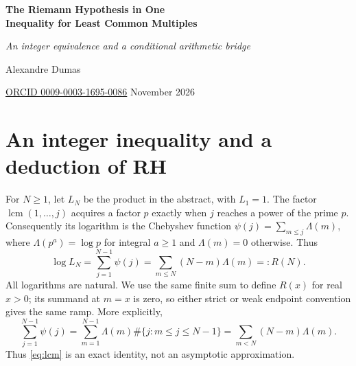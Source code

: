 \documentclass[11pt,a4paper]{article}
\newcommand{\lcm}{\operatorname{lcm}}
\begin{document}
\thispagestyle{plain}
\begin{center}
{\fontsize{22}{26}\selectfont\bfseries The Riemann Hypothesis in One\\[2pt] Inequality for Least Common Multiples\par}
\vspace{7pt}
{\large\itshape An integer equivalence and a conditional arithmetic bridge\par}
\vspace{12pt}
{\large Alexandre Dumas\par}
\vspace{2pt}
{\small\href{https://orcid.org/0009-0003-1695-0086}{ORCID 0009-0003-1695-0086}\quad\textperiodcentered{} November 2026\par}
\end{center}
\begin{abstract}
Put $L_N=\prod_{j=1}^{N-1}\lcm(1,\ldots,j)$. We establish the equivalence between the Riemann hypothesis and $L_{n^2}^{\,4}\le 2^{n^3}L_{2n^2}$ for all positive integers $n$, by the explicit formula and a direct Mellin-positivity converse. We also formulate a prime-power inequality supported on $(n^2,8n^2)$ and a two-sided power-window growth law for absolutely convergent zero expansions. A short deduction of RH from a uniform centered-von-Mangoldt window estimate, denoted (W), is \emph{conditional on that estimate}. The analytic argument is supplied here; the deduction of the precise quantified statement (W) from the Alp\"oge--Claude formal development is not independently established in this note. This distinction is essential to the paper's scope.
\end{abstract}

\section{An integer inequality and a deduction of RH}
For $N\ge1$, let $L_N$ be the product in the abstract, with $L_1=1$. The factor $\lcm(1,\ldots,j)$ acquires a factor $p$ exactly when $j$ reaches a power of the prime $p$. Consequently its logarithm is the Chebyshev function $\psi(j)=\sum_{m\le j}\Lambda(m)$, where $\Lambda(p^a)=\log p$ for integral $a\ge1$ and $\Lambda(m)=0$ otherwise. Thus
\begin{equation}\label{eq:lcm}
 \log L_N=\sum_{j=1}^{N-1}\psi(j)=\sum_{m\le N}(N-m)\Lambda(m)=:R(N).
\end{equation}
All logarithms are natural. We use the same finite sum to define $R(x)$ for real $x>0$; its summand at $m=x$ is zero, so either strict or weak endpoint convention gives the same ramp. More explicitly,
\[
\sum_{j=1}^{N-1}\psi(j)=\sum_{m=1}^{N-1}\Lambda(m)
  \#\{j:m\le j\le N-1\}
 =\sum_{m<N}(N-m)\Lambda(m).
\]
Thus \eqref{eq:lcm} is an exact identity, not an asymptotic approximation.
\end{document}
